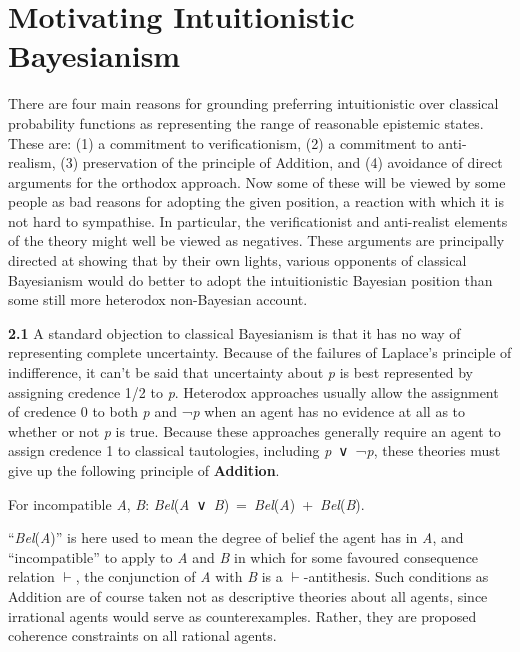 \documentclass[
  10pt,
  letterpaper,
  DIV=11,
  numbers=noendperiod,
  twoside]{scrartcl}
\providecommand{\tightlist}{%
  \setlength{\itemsep}{0pt}\setlength{\parskip}{0pt}}\usepackage{longtable,booktabs,array}
\begin{document}
\section{Motivating Intuitionistic
Bayesianism}\label{motivating-intuitionistic-bayesianism}

There are four main reasons for grounding preferring intuitionistic over
classical probability functions as representing the range of reasonable
epistemic states. These are: (1) a commitment to verificationism, (2) a
commitment to anti-realism, (3) preservation of the principle of
Addition, and (4) avoidance of direct arguments for the orthodox
approach. Now some of these will be viewed by some people as bad reasons
for adopting the given position, a reaction with which it is not hard to
sympathise. In particular, the verificationist and anti-realist elements
of the theory might well be viewed as negatives. These arguments are
principally directed at showing that by their own lights, various
opponents of classical Bayesianism would do better to adopt the
intuitionistic Bayesian position than some still more heterodox
non-Bayesian account.

\textbf{2.1} A standard objection to classical Bayesianism is that it
has no way of representing complete uncertainty. Because of the failures
of Laplace's principle of indifference, it can't be said that
uncertainty about \emph{p} is best represented by assigning credence 1/2
to \emph{p}. Heterodox approaches usually allow the assignment of
credence 0 to both \emph{p} and ¬\emph{p} when an agent has no evidence
at all as to whether or not \emph{p} is true. Because these approaches
generally require an agent to assign credence 1 to classical
tautologies, including \emph{p}~∨~¬\emph{p}, these theories must give up
the following principle of \textbf{Addition}.

\begin{description}
\tightlist
\item[Addition]
For incompatible \emph{A}, \emph{B}:
\emph{Bel}(\emph{A}~∨~\emph{B})~=~\emph{Bel}(\emph{A})~+~\emph{Bel}(\emph{B}).
\end{description}

``\emph{Bel}(\emph{A})'' is here used to mean the degree of belief the
agent has in \emph{A}, and ``incompatible'' to apply to \emph{A} and
\emph{B} in which for some favoured consequence relation \(\vdash\), the
conjunction of \emph{A} with \emph{B} is a \(\vdash\)-antithesis. Such
conditions as Addition are of course taken not as descriptive theories
about all agents, since irrational agents would serve as
counterexamples. Rather, they are proposed coherence constraints on all
rational agents.
\end{document}
